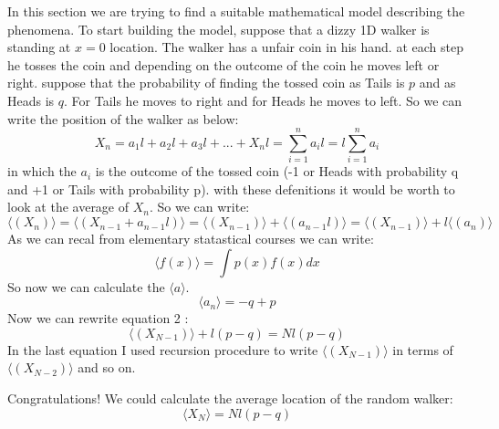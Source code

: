 \documentclass[12pt,a4paper]{article}
\begin{document}
In this section we are trying to find a suitable mathematical model describing the phenomena. To start building the model, suppose that a dizzy 1D walker is standing at $x=0$ location. The walker has a unfair coin in his hand. at each step he tosses the coin and depending on the outcome of the coin he moves left or right. suppose that the probability of finding the tossed coin as Tails is $p$ and as Heads is $q$. For Tails he moves to right and for Heads he moves to left. So we can write the position of the walker as below:
\begin{equation}
X_{n}  = a_{1}l + a_{2}l + a_{3}l + ... + X_{n}l = \sum_{i=1}^{n} a_{i}l = l\sum_{i=1}^{n} a_{i}
\end{equation}
in which the $a_{i}$ is the outcome of the tossed coin (-1 or Heads with probability q and +1 or Tails with probability p). with these defenitions it would be worth to look at the average of $X_{n}$. So we can write:
\begin{equation}
\langle(X_{n})\rangle = \langle(X_{n-1} + a_{n-1}l)\rangle = \langle(X_{n-1})\rangle + \langle(a_{n-1}l)\rangle
=\langle(X_{n-1})\rangle + l\langle(a_{n})\rangle
\end{equation}
As we can recal from elementary statastical courses we can write:
\begin{equation}
\langle f(x)\rangle = \int p(x)f(x)dx 
\end{equation}
So now we can calculate the $\langle a\rangle$.
\begin{equation}
\langle a_{n} \rangle = -q + p
\end{equation}
Now we can rewrite equation 2 :
\begin{equation}
\langle(X_{N-1})\rangle + l(p-q) = Nl(p-q)
\end{equation}
In the last equation I used recursion procedure to write $\langle(X_{N-1})\rangle$ in terms of $\langle(X_{N-2})\rangle$  and so on.

Congratulations! We could calculate the average location of the random walker:
\begin{equation}
\langle X_{N} \rangle = Nl(p-q)
\end{equation}
\end{document}

